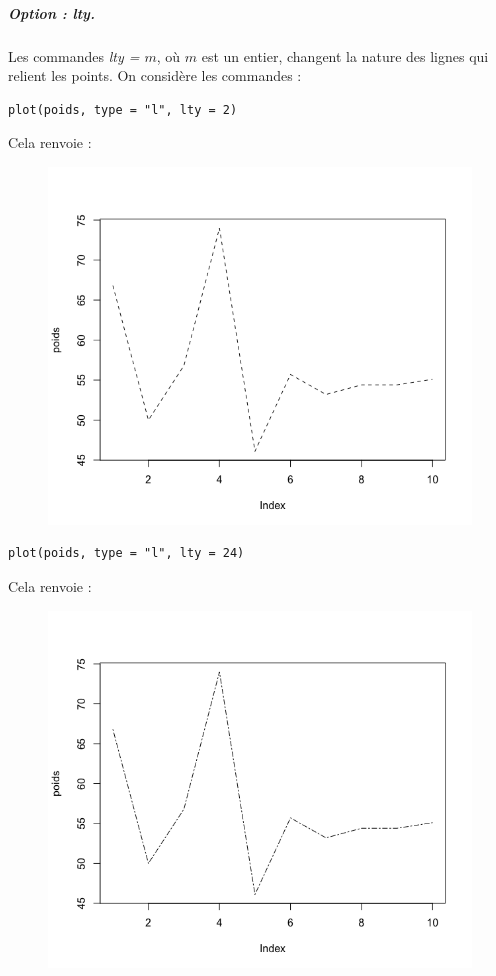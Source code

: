 \subparagraph{Option : lty.} 
Les commandes \textit{lty = $m$}, où $m$ est un entier, changent la nature des lignes qui relient les points.\newline
On considère les commandes :
\begin{lstlisting}[language=html]
plot(poids, type = "l", lty = 2)
\end{lstlisting}
Cela renvoie :
\begin{figure}[H]\begin{center}\includegraphics[scale=0.4]{ilu/gra21.png}\end{center}\end{figure}
\begin{lstlisting}[language=html]
plot(poids, type = "l", lty = 24)
\end{lstlisting}
Cela renvoie :
\begin{figure}[H]\begin{center}\includegraphics[scale=0.4]{ilu/gra22.png}\end{center}\end{figure}
